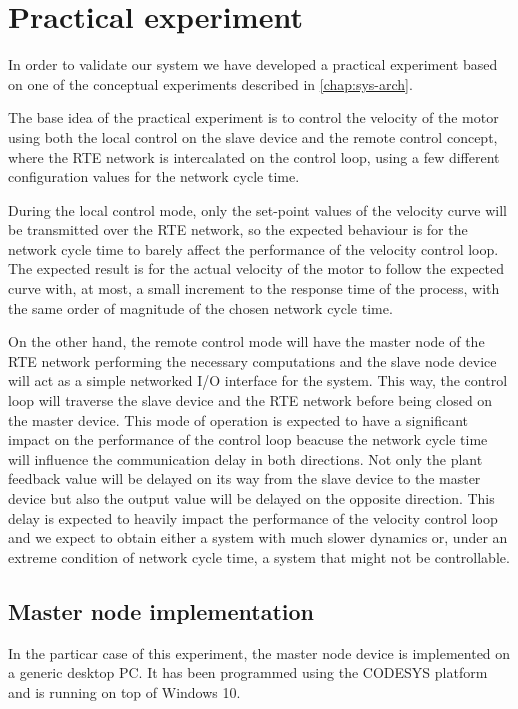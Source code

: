 \section{Practical experiment}
In order to validate our system we have developed a practical experiment based on one of the conceptual experiments described in \autoref{chap:sys-arch}.

The base idea of the practical experiment is to control the velocity of the motor using both the local control on the slave device and the remote control concept, where the RTE network is intercalated on the control loop, using a few different configuration values for the network cycle time.

During the local control mode, only the set-point values of the velocity curve will be transmitted over the RTE network, so the expected behaviour is for the network cycle time to barely affect the performance of the velocity control loop.
The expected result is for the actual velocity of the motor to follow the expected curve with, at most, a small increment to the response time of the process, with the same order of magnitude of the chosen network cycle time.

On the other hand, the remote control mode will have the master node of the RTE network performing the necessary computations and the slave node device will act as a simple networked I/O interface for the system.
This way, the control loop will traverse the slave device and the RTE network before being closed on the master device.
This mode of operation is expected to have a significant impact on the performance of the control loop beacuse the network cycle time will influence the communication delay in both directions.
Not only the plant feedback value will be delayed on its way from the slave device to the master device but also the output value will be delayed on the opposite direction.
This delay is expected to heavily impact the performance of the velocity control loop and we expect to obtain either a system with much slower dynamics or, under an extreme condition of network cycle time, a system that might not be controllable.



\subsection{Master node implementation}
In the particar case of this experiment, the master node device is implemented on a generic desktop PC.
It has been programmed using the CODESYS platform and is running on top of Windows 10\texttrademark{}.

